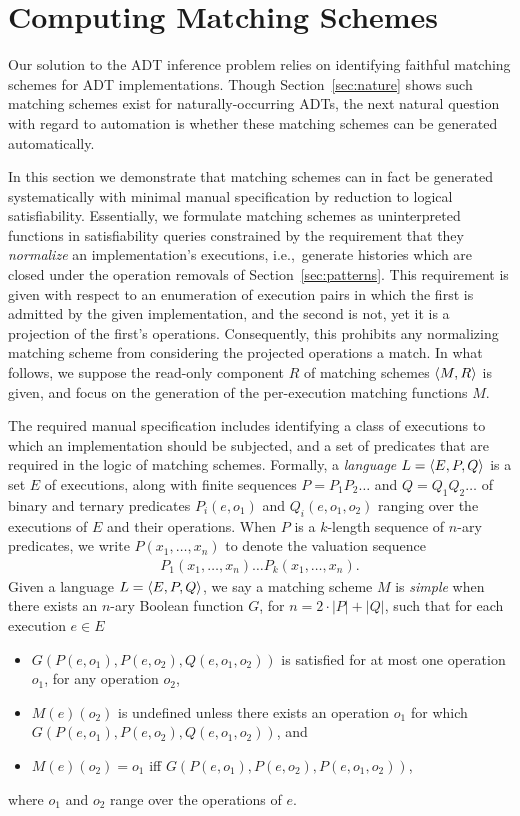 \section{Computing Matching Schemes}
\label{sec:matching}

Our solution to the ADT inference problem relies on identifying faithful
matching schemes for ADT implementations. Though Section~\ref{sec:nature} shows
such matching schemes exist for naturally-occurring ADTs, the next natural
question with regard to automation is whether these matching schemes can be
generated automatically.

In this section we demonstrate that matching schemes can in fact be generated
systematically with minimal manual specification by reduction to logical
satisfiability. Essentially, we formulate matching schemes as uninterpreted
functions in satisfiability queries constrained by the requirement that they
\emph{normalize} an implementation’s executions, i.e.,~generate histories which
are closed under the operation removals of Section~\ref{sec:patterns}. This
requirement is given with respect to an enumeration of execution pairs in which
the first is admitted by the given implementation, and the second is not, yet
it is a projection of the first’s operations. Consequently, this prohibits any
normalizing matching scheme from considering the projected operations a match.
In what follows, we suppose the read-only component $R$ of matching schemes
${\left\langle{M,R}\right\rangle}$ is given, and focus on the generation of the per-execution matching
functions $M$.

The required manual specification includes identifying a class of executions to
which an implementation should be subjected, and a set of predicates that are
required in the logic of matching schemes. Formally, a \emph{language} $L =
{\left\langle{E,P,Q}\right\rangle}$ is a set $E$ of executions, along with finite sequences $P = P_1
P_2 \ldots$ and $Q = Q_1 Q_2 \ldots$ of binary and ternary predicates
$P_i(e,o_1)$ and $Q_i(e,o_1,o_2)$ ranging over the executions of $E$ and their
operations. When $P$ is a $k$-length sequence of $n$-ary predicates, we write
$P(x_1, \ldots, x_n)$ to denote the valuation sequence
\begin{align*}
  P_1(x_1, \ldots, x_n) \ldots P_k(x_1, \ldots, x_n).
\end{align*}
Given a language $L = {\left\langle{E,P,Q}\right\rangle}$, we say a matching scheme $M$ is
\emph{simple} when there exists an $n$-ary Boolean function $G$, for $n =
2\cdot|P|+|Q|$, such that for each execution $e \in E$
\begin{itemize}

  \item $G(P(e,o_1),P(e,o_2),Q(e,o_1,o_2))$ is satisfied for at most one
  operation $o_1$, for any operation $o_2$,

  \item $M(e)(o_2)$ is undefined unless there exists an operation $o_1$
  for which $G(P(e,o_1),P(e,o_2),Q(e,o_1,o_2))$, and

  \item $M(e)(o_2) = o_1$ if{f} $G(P(e,o_1),P(e,o_2),P(e,o_1,o_2))$,

\end{itemize}
where $o_1$ and $o_2$ range over the operations of $e$.

